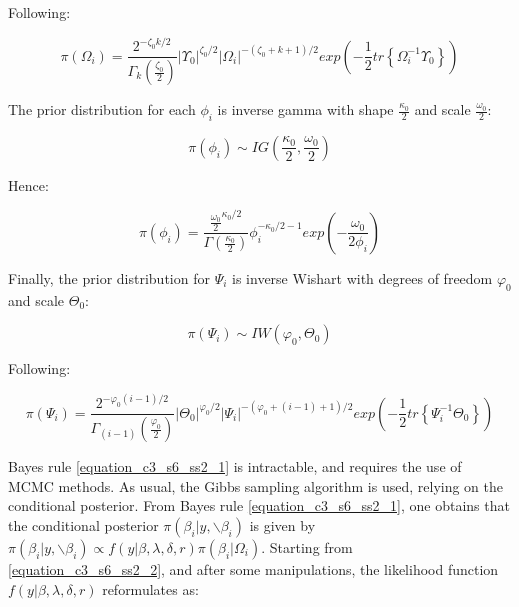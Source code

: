 Following:

\begin{equation}
\pi(\Omega_i)=\frac{2^{-\zeta_0 k/2}}{\Gamma_k \left( \frac{\zeta_0}{2} \right)} |\Upsilon_0|^{\zeta_0/2} |\Omega_i|^{-(\zeta_0+k+1)/2} exp \left( -\frac{1}{2} tr \left\{ \Omega_i^{-1} \Upsilon_0 \right\} \right)
\label{equation_c3_s6_ss2_4} 
\end{equation}

The prior distribution for each $\phi_i$ is inverse gamma with shape $\frac{\kappa_0}{2}$ and scale $\frac{\omega_0}{2}$:

\begin{equation}
\pi(\phi_i) \sim IG \left( \frac{\kappa_0}{2},\frac{\omega_0}{2} \right)
\label{equation_c3_s6_ss2_5}
\end{equation}

Hence:

\begin{equation}
\pi(\phi_i)=\frac{\frac{\omega_0}{2}^{\kappa_0/2}}{\Gamma(\frac{\kappa_0}{2})} \phi_i^{-\kappa_0/2-1} exp \left( - \frac{\omega_0}{2\phi_i} \right)
\label{equation_c3_s6_ss2_6}
\end{equation}

Finally, the prior distribution for $\Psi_i$ is inverse Wishart with degrees of freedom $\varphi_0$ and scale $\Theta_0$:

\begin{equation}
\pi(\Psi_i) \sim IW \left( \varphi_0,\Theta_0 \right)
\label{equation_c3_s6_ss2_7} 
\end{equation}

Following:

\begin{equation}
\pi(\Psi_i)=\frac{2^{-\varphi_0 (i-1)/2}}{\Gamma_{(i-1)} \left( \frac{\varphi_0}{2} \right)} |\Theta_0|^{\varphi_0/2} |\Psi_i|^{-(\varphi_0+(i-1)+1)/2} exp \left( -\frac{1}{2} tr \left\{ \Psi_i^{-1} \Theta_0 \right\} \right)
\label{equation_c3_s6_ss2_8}
\end{equation}

\newpage

Bayes rule \ref{equation_c3_s6_ss2_1} is intractable, and requires the use of MCMC methods. As usual, the Gibbs sampling algorithm is used, relying on the conditional posterior. From Bayes rule \ref{equation_c3_s6_ss2_1}, one obtains that the conditional posterior $\pi(\beta_i | y, \backslash \beta_i)$ is given by $\pi(\beta_i | y, \backslash \beta_i) \propto f(y | \beta, \lambda, \delta, r) \pi(\beta_i | \Omega_i)$. Starting from \ref{equation_c3_s6_ss2_2}, and after some manipulations, the likelihood function $f(y | \beta, \lambda, \delta, r)$ reformulates as:

